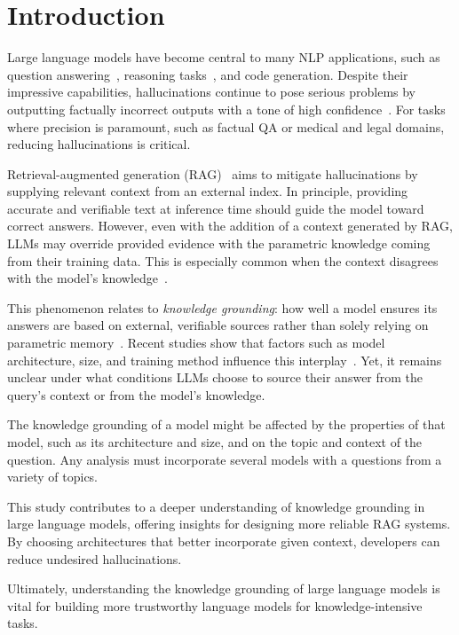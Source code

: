 \section{Introduction}

Large language models have become central to many NLP applications, such as question answering~\cite{gpt3,how_can_we_know}, reasoning tasks~\cite{treeofthoughts}, and code generation\cite{alphacode_generation}.
Despite their impressive capabilities, hallucinations continue to pose serious problems by outputting factually incorrect outputs with a tone of high confidence~\cite{how_can_we_know}.
For tasks where precision is paramount, such as factual QA or medical and legal domains, reducing hallucinations is critical\cite{mitigating_hallucinations}.

Retrieval-augmented generation (RAG)~\cite{rag} aims to mitigate hallucinations by supplying relevant context from an external index.
In principle, providing accurate and verifiable text at inference time should guide the model toward correct answers.
However, even with the addition of a context generated by RAG, LLMs may override provided evidence with the parametric knowledge coming from their training data.
This is especially common when the context disagrees with the model's knowledge~\cite{factual_recall,ragged}.

This phenomenon relates to \emph{knowledge grounding}: how well a model ensures its answers are based on external, verifiable sources rather than solely relying on parametric memory~\cite{rag}.
Recent studies show that factors such as model architecture, size, and training method influence this interplay~\cite{factual_recall,flant5,llama}.
Yet, it remains unclear under what conditions LLMs choose to source their answer from the query's context or from the model's knowledge.

The knowledge grounding of a model might be affected by the properties of that model, such as its architecture and size, and on the topic and context of the question.
Any analysis must incorporate several models with a questions from a variety of topics.

This study contributes to a deeper understanding of knowledge grounding in large language models, offering insights for designing more reliable RAG systems.
By choosing architectures that better incorporate given context, developers can reduce undesired hallucinations.

Ultimately, understanding the knowledge grounding of large language models is vital for building more trustworthy language models for knowledge-intensive tasks.
